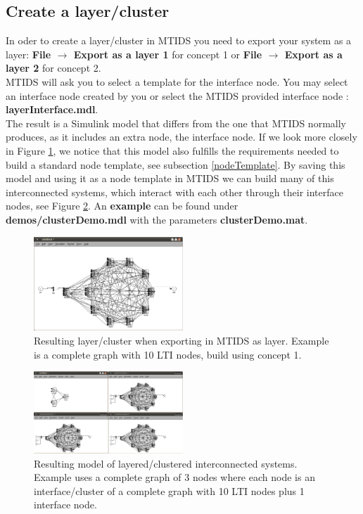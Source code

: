 \documentclass[a4paper,twoside, openright,12pt]{report}
\begin{document}
\subsection{Create a layer/cluster}

In oder to create a layer/cluster in MTIDS you need to export your system as a layer: \textbf{File $\rightarrow$ Export as a layer 1} for concept 1 or
\textbf{File $\rightarrow$ Export as a layer 2} for concept 2.\\

MTIDS will ask you to select a template for the interface node. You may select an interface node created by you or select the MTIDS provided
interface node : \textbf{layerInterface.mdl}.\\
The result is a Simulink model that differs from the one that MTIDS normally produces, as it includes an extra node, the interface node.
If we look more closely in Figure \ref{layerFig}, we notice that this model also fulfills the requirements needed to build a standard node template, see subsection \ref{nodeTemplate}.
By saving this model and using it as a node template in MTIDS we can build many of this interconnected systems, which interact with each other through their 
interface nodes, see Figure \ref{layersFig}. An \textbf{example} can be found under \textbf{demos/clusterDemo.mdl} with the parameters \textbf{clusterDemo.mat}.


\begin{figure}[htb]
\centering
\includegraphics[width=0.5\textwidth]{pics/screenLayer.eps}
\caption[MTIDS export as layer resulting model]{Resulting layer/cluster when exporting in MTIDS as layer. Example is a complete graph with 10 LTI nodes, build using concept 1.}
\label{layerFig}
\end{figure}



\begin{figure}[htb]
\centering
\includegraphics[width=0.5\textwidth]{pics/screenLayers.eps}
\caption[MTIDS model of layered/clustered interconnected systems]{Resulting model of layered/clustered interconnected systems. Example uses a complete graph of 3 nodes where each node is an interface/cluster of a complete graph with 10 LTI nodes plus 1 interface node.}
\label{layersFig}
\end{figure}
\end{document}
